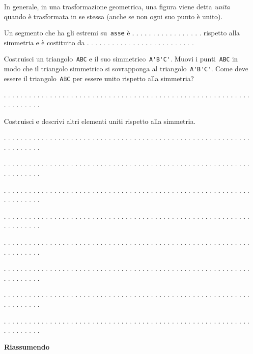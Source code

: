 In generale, in una trasformazione geometrica, una figura viene detta 
\emph{unita}
quando è trasformata in se stessa (anche se non ogni suo punto è unito).

Un segmento che ha gli estremi su~\lstinline{asse} 
è . . . . . . . . . . . . . . . . .
rispetto alla simmetria e è
costituito da . . . . . . . . . . . . . . . . . . . . . . . . . .

Costruisci un triangolo~\lstinline{ABC} e il suo simmetrico~\lstinline{A'B'C'}.
Muovi i punti~\lstinline{ABC} in modo che il triangolo simmetrico si sovrapponga 
al
triangolo~\lstinline{A'B'C'}.
Come deve essere il triangolo~\lstinline{ABC} per essere unito rispetto alla 
simmetria?

. . . . . . . . . . . . . . . . . . . . . . . . . . . . . . . . . . . . . . . .
. . . . . . . . . . . . . . . . . . . . . . . . . . . .

Costruisci e descrivi altri elementi uniti rispetto alla simmetria.

. . . . . . . . . . . . . . . . . . . . . . . . . . . . . . . . . . . . . . . .
. . . . . . . . . . . . . . . . . . . . . . . . . . . .

. . . . . . . . . . . . . . . . . . . . . . . . . . . . . . . . . . . . . . . .
. . . . . . . . . . . . . . . . . . . . . . . . . . . .

. . . . . . . . . . . . . . . . . . . . . . . . . . . . . . . . . . . . . . . .
. . . . . . . . . . . . . . . . . . . . . . . . . . . .

. . . . . . . . . . . . . . . . . . . . . . . . . . . . . . . . . . . . . . . .
. . . . . . . . . . . . . . . . . . . . . . . . . . . .

. . . . . . . . . . . . . . . . . . . . . . . . . . . . . . . . . . . . . . . .
. . . . . . . . . . . . . . . . . . . . . . . . . . . .

. . . . . . . . . . . . . . . . . . . . . . . . . . . . . . . . . . . . . . . .
. . . . . . . . . . . . . . . . . . . . . . . . . . . .

. . . . . . . . . . . . . . . . . . . . . . . . . . . . . . . . . . . . . . . .
. . . . . . . . . . . . . . . . . . . . . . . . . . . .

. . . . . . . . . . . . . . . . . . . . . . . . . . . . . . . . . . . . . . . .
. . . . . . . . . . . . . . . . . . . . . . . . . . . .

\textbf{Riassumendo}

